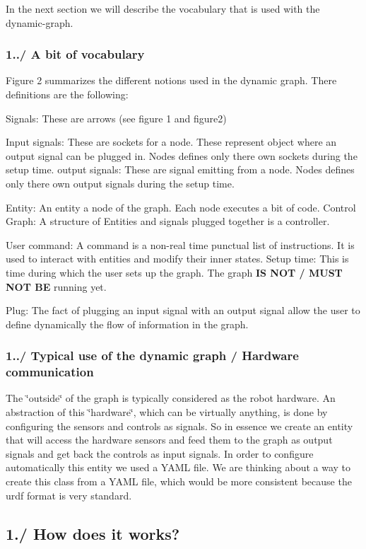 In the next section we will describe the vocabulary that is used with the dynamic-\/graph.\hypertarget{index_intro_subsec_vocabulary}{}\subsubsection{1../ A bit of vocabulary}\label{index_intro_subsec_vocabulary}
 Figure 2 summarizes the different notions used in the dynamic graph. There definitions are the following\+:
\begin{DoxyItemize}
\item Signals\+: These are arrows (see figure 1 and figure2)
\item Input signals\+: These are sockets for a node. These represent object where an output signal can be plugged in. Nodes defines only there own sockets during the setup time. output signals\+: These are signal emitting from a node. Nodes defines only there own output signals during the setup time.
\item Entity\+: An entity a node of the graph. Each node executes a bit of code. Control Graph\+: A structure of Entities and signals plugged together is a controller.
\item User command\+: A command is a non-\/real time punctual list of instructions. It is used to interact with entities and modify their inner states. Setup time\+: This is time during which the user sets up the graph. The graph {\bfseries IS N\+OT / M\+U\+ST N\+OT BE} running yet.
\item Plug\+: The fact of plugging an input signal with an output signal allow the user to define dynamically the flow of information in the graph.
\end{DoxyItemize}\hypertarget{index_intro_subsec_use}{}\subsubsection{1../ Typical use of the dynamic graph / Hardware communication}\label{index_intro_subsec_use}
The \char`\"{}outside\char`\"{} of the graph is typically considered as the robot hardware. An abstraction of this \char`\"{}hardware\char`\"{}, which can be virtually anything, is done by configuring the sensors and controls as signals. So in essence we create an entity that will access the hardware sensors and feed them to the graph as output signals and get back the controls as input signals. In order to configure automatically this entity we used a Y\+A\+ML file. We are thinking about a way to create this class from a Y\+A\+ML file, which would be more consistent because the urdf format is very standard.\hypertarget{index_intro_sec_how_it_works}{}\subsection{1./ How does it works?}\label{index_intro_sec_how_it_works}
